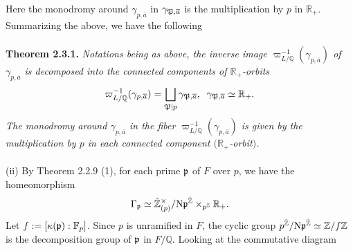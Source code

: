 \documentclass[12pt, leqno]{article}
\begin{document}
\begin{center}
\end{center}
Here the monodromy around $\gamma_{p, \overline{a}}$ in $\gamma_{\frak{P}, \overline{a}}$ is the multiplication by $p$ in 
$\mathbb{R}_+$.  Summarizing the above, we have the following\\
\\
{\bf Theorem 2.3.1.} {\it Notations being as above,   the inverse image $\varpi_{L/\mathbb{Q}}^{-1}(\gamma_{p, \overline{a}})$ of $\gamma_{p, \overline{a}}$ is decomposed  into the connected components of $\mathbb{R}_+$-orbits}
$$ \varpi_{L/\mathbb{Q}}^{-1}(\gamma_{p, \overline{a}}) = \bigsqcup_{\frak{P} \mid p} \gamma_{\frak{P}, \overline{a}}, \;\; \gamma_{\frak{P}, \overline{a}} \simeq \mathbb{R}_+.$$
{\it The monodromy around $\gamma_{p, \bar{a}}$ in the fiber $\varpi_{L/\mathbb{Q}}^{-1}(\gamma_{p, \bar{a}})$ is given by the multiplication by $p$ in each connected component $(\mathbb{R}_+$-orbit$)$.}\\
\\
(ii) By Theorem 2.2.9 (1), for each prime $\frak{p}$ of $F$ over $p$, we have the homeomorphism
$$ \Gamma_{\frak{p}} \simeq \hat{\mathbb{Z}}_{(p)}^{\times}/{\rm N}\frak{p}^{\hat{\mathbb{Z}}} \times_{p^{\mathbb{Z}}} \mathbb{R}_+.$$
Let $f := [\kappa(\frak{p}) : \mathbb{F}_p]$. Since $p$ is unramified in $F$, the cyclic group $p^{\hat{\mathbb{Z}}}/{\rm N}\frak{p}^{\hat{\mathbb{Z}}} \simeq \mathbb{Z}/f \mathbb{Z}$ is the decomposition group of $\frak{p}$ in $F/\mathbb{Q}$. 
Looking at the commutative  diagram
\begin{center}
\end{center}
\end{document}
